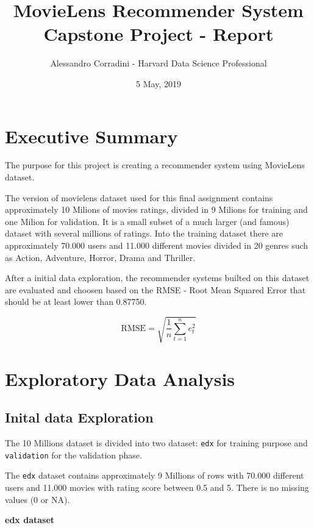 \documentclass[]{article}
\title{MovieLens Recommender System Capstone Project - Report}
\author{Alessandro Corradini - Harvard Data Science Professional}
\date{5 May, 2019}
\begin{document}
\maketitle

{
\setcounter{tocdepth}{2}
\tableofcontents
}
\newpage

\hypertarget{executive-summary}{%
\section{Executive Summary}\label{executive-summary}}

The purpose for this project is creating a recommender system using
MovieLens dataset.

The version of movielens dataset used for this final assignment contains
approximately 10 Milions of movies ratings, divided in 9 Milions for
training and one Milion for validation. It is a small subset of a much
larger (and famous) dataset with several millions of ratings. Into the
training dataset there are approximately 70.000 users and 11.000
different movies divided in 20 genres such as Action, Adventure, Horror,
Drama and Thriller.

After a initial data exploration, the recommender systems builted on
this dataset are evaluated and choosen based on the RMSE - Root Mean
Squared Error that should be at least lower than 0.87750.

\[\mbox{RMSE} = \sqrt{\frac{1}{n}\sum_{t=1}^{n}e_t^2}\]

\hypertarget{exploratory-data-analysis}{%
\section{Exploratory Data Analysis}\label{exploratory-data-analysis}}

\hypertarget{inital-data-exploration}{%
\subsection{Inital data Exploration}\label{inital-data-exploration}}

The 10 Millions dataset is divided into two dataset: \texttt{edx} for
training purpose and \texttt{validation} for the validation phase.

The \texttt{edx} dataset contains approximately 9 Millions of rows with
70.000 different users and 11.000 movies with rating score between 0.5
and 5. There is no missing values (0 or NA).

\textbf{edx dataset}
\end{document}
